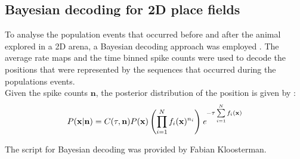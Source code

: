 \subsection{Bayesian decoding for 2D place fields}
To analyse the population events that occurred before and after the animal explored in a 2D arena, a Bayesian decoding approach was employed \cite{Zhang2013}. The average rate maps and the time binned spike counts were used to decode the positions that were represented by the sequences that occurred during the populations events. \\
Given the spike counts $\mathbf{n}$, the posterior distribution of the position is given by : 
\[ 
P( \mathbf{x} | \mathbf{n}) = C(\tau, \mathbf{n}) P(\mathbf{x}) \left(\prod_{i = 1}^{N} f_{i}(\mathbf{x})^{n_i} \right) \emph{e}^{-\tau \sum\limits_{i = 1}^{N} f_{i}(\mathbf{x}) }
 \]

The script for Bayesian decoding was provided by Fabian Kloosterman.
	

